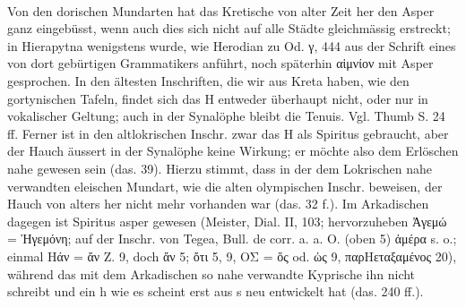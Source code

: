 \paragraph{} Von den dorischen Mundarten hat das Kretische von alter Zeit her den Asper ganz eingebüsst, wenn auch dies sich nicht auf alle Städte gleichmässig erstreckt; in Hierapytna wenigstens wurde, wie Herodian zu Od. γ, 444 aus der Schrift eines von dort gebürtigen Grammatikers anführt, noch späterhin αἱμνίον mit Asper gesprochen. In den ältesten Inschriften, die wir aus Kreta haben, wie den gortynischen Tafeln, findet sich das H entweder überhaupt nicht, oder nur in vokalischer Geltung; auch in der Synalöphe bleibt die Tenuis. Vgl. Thumb S. 24 ff. Ferner ist in den altlokrischen Inschr. zwar das H als Spiritus gebraucht, aber der Hauch äussert in der Synalöphe keine Wirkung; er möchte also dem Erlöschen nahe gewesen sein (das. 39). Hierzu stimmt, dass in der dem Lokrischen nahe verwandten eleischen Mundart, wie die alten olympischen Inschr. beweisen, der Hauch von alters her nicht mehr vorhanden war (das. 32 f.). Im Arkadischen dagegen ist Spiritus asper gewesen (Meister, Dial. II, 103; hervorzuheben Ἀγεμώ = Ἡγεμόνη; auf der Inschr. von Tegea, Bull. de corr. a. a. O. (oben 5) ἀμέρα s. o.; einmal Ηάν = ἄν Z. 9, doch ἄν 5; ὄτι 5, 9, ΟΣ = ὅς od. ὡς 9, παρΗεταξαμένος 20), während das mit dem Arkadischen so nahe verwandte Kyprische ihn nicht schreibt und ein h wie es scheint erst aus s neu entwickelt hat (das. 240 ff.). 

